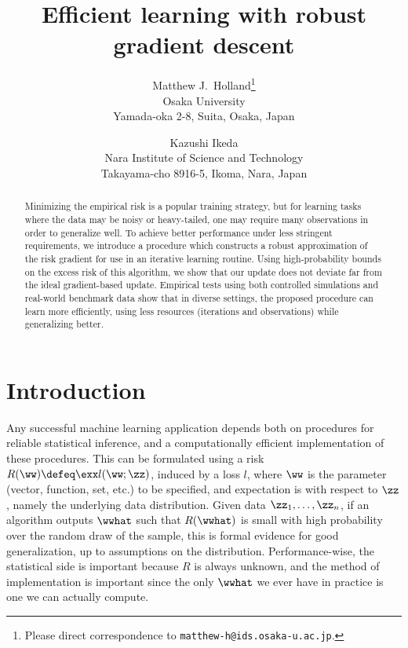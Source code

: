 \documentclass[11pt,oneside]{article}
\theoremstyle{definition} \newtheorem{defn}{Definition}       %
\theoremstyle{plain} \newtheorem{prop}[defn]{Proposition}           %
\theoremstyle{plain} \newtheorem{thm}[defn]{Theorem}                %
\theoremstyle{plain} \newtheorem{lem}[defn]{Lemma}                  %
\theoremstyle{plain} \newtheorem{cor}[defn]{Corollary}              %
\theoremstyle{remark} \newtheorem{rmk}[defn]{Remark}                %
\theoremstyle{remark} \newtheorem{ex}[defn]{Example}                %
\begin{document}
\title{\textbf{Efficient learning with robust gradient descent}}
\author{
  Matthew J.~Holland\thanks{Please direct correspondence to \texttt{matthew-h@ids.osaka-u.ac.jp}.}\\
  Osaka University\\
  Yamada-oka 2-8, Suita, Osaka, Japan
  \and
  Kazushi Ikeda\\
  Nara Institute of Science and Technology\\
  Takayama-cho 8916-5, Ikoma, Nara, Japan
}
\date{} %



\maketitle

\begin{abstract}
Minimizing the empirical risk is a popular training strategy, but for learning tasks where the data may be noisy or heavy-tailed, one may require many observations in order to generalize well. To achieve better performance under less stringent requirements, we introduce a procedure which constructs a robust approximation of the risk gradient for use in an iterative learning routine. Using high-probability bounds on the excess risk of this algorithm, we show that our update does not deviate far from the ideal gradient-based update. Empirical tests using both controlled simulations and real-world benchmark data show that in diverse settings, the proposed procedure can learn more efficiently, using less resources (iterations and observations) while generalizing better.
\end{abstract}


\section{Introduction}\label{sec:intro}


Any successful machine learning application depends both on procedures for reliable statistical inference, and a computationally efficient implementation of these procedures. This can be formulated using a risk $R(\ww) \defeq \exx l(\ww;\zz)$, induced by a loss $l$, where $\ww$ is the parameter (vector, function, set, etc.) to be specified, and expectation is with respect to $\zz$, namely the underlying data distribution. Given data $\zz_{1},\ldots,\zz_{n}$, if an algorithm outputs $\wwhat$ such that $R(\wwhat)$ is small with high probability over the random draw of the sample, this is formal evidence for good generalization, up to assumptions on the distribution. Performance-wise, the statistical side is important because $R$ is always unknown, and the method of implementation is important since the only $\wwhat$ we ever have in practice is one we can actually compute.
\end{document}
